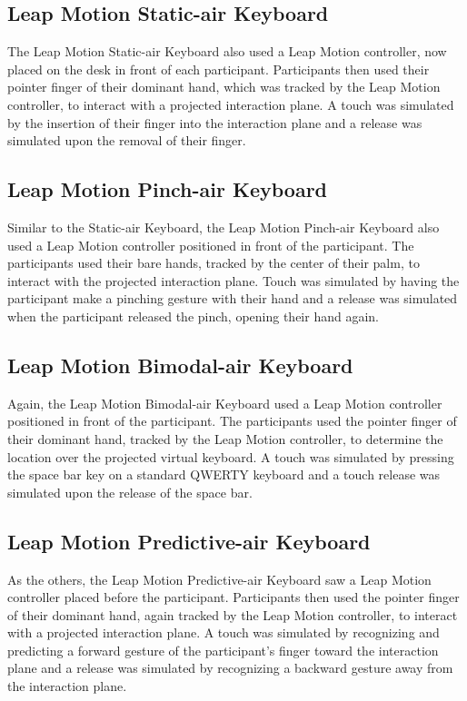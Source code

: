 \subsection{Leap Motion Static-air Keyboard}
The Leap Motion Static-air Keyboard also used a Leap Motion controller, now placed on the desk in front of each participant. Participants then used their pointer finger of their dominant hand, which was tracked by the Leap Motion controller, to interact with a projected interaction plane. A touch was simulated by the insertion of their finger into the interaction plane and a release was simulated upon the removal of their finger.

\subsection{Leap Motion Pinch-air Keyboard}
Similar to the Static-air Keyboard, the Leap Motion Pinch-air Keyboard also used a Leap Motion controller positioned in front of the participant. The participants used their bare hands, tracked by the center of their palm, to interact with the projected interaction plane. Touch was simulated by having the participant make a pinching gesture with their hand and a release was simulated when the participant released the pinch, opening their hand again.

\subsection{Leap Motion Bimodal-air Keyboard}
Again, the Leap Motion Bimodal-air Keyboard used a Leap Motion controller positioned in front of the participant. The participants used the pointer finger of their dominant hand, tracked by the Leap Motion controller, to determine the location over the projected virtual keyboard. A touch was simulated by pressing the space bar key on a standard QWERTY keyboard and a touch release was simulated upon the release of the space bar.

\subsection{Leap Motion Predictive-air Keyboard}
As the others, the Leap Motion Predictive-air Keyboard saw a Leap Motion controller placed before the participant. Participants then used the pointer finger of their dominant hand, again tracked by the Leap Motion controller, to interact with a projected interaction plane. A touch was simulated by recognizing and predicting a forward gesture of the participant's finger toward the interaction plane and a release was simulated by recognizing a backward gesture away from the interaction plane.

